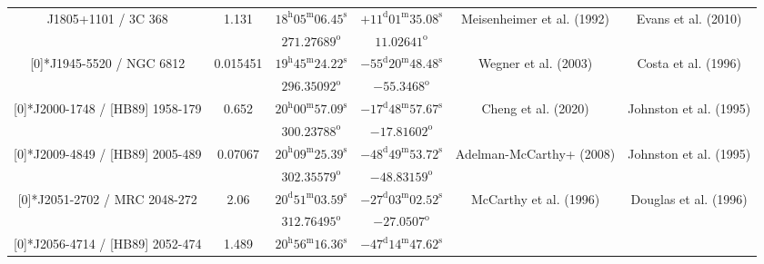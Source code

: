 \begin{landscape}
\begin{longtable}{cccccc}
  \multirow{2}[0]{*}{J1805+1101 / 3C 368} & \multirow{2}[0]{*}{1.131} &  
    $18^\text{h}05^\text{m}06.45^\text{s}$  & $+11^\text{d}01^\text{m}35.08^\text{s}$  & 
    \multirow{2}[0]{*}{Meisenheimer et al. (1992)\cite{RedRef71_1992}}& \multirow{2}[0]{*}{Evans et al. (2010)\cite{CoordRef1_2010}} \\*
    & & $271.27689^\text{o}$ & $11.02641^\text{o}$ & & \\ \addlinespace 
 \multirow{2}[0]{*}{J1945-5520 / NGC 6812} & \multirow{2}[0]{*}{0.015451} &  
    $19^\text{h}45^\text{m}24.22^\text{s}$  & $ -55^\text{d}20^\text{m}48.48^\text{s}$  & 
    \multirow{2}[0]{*}{Wegner et al. (2003)\cite{RedRef72_2003}}& \multirow{2}[0]{*}{Costa et al. (1996)\cite{CoordRef72_1996}} \\*
    & & $296.35092^\text{o}$ & $-55.3468^\text{o}$ & & \\ \addlinespace 
 \multirow{2}[0]{*}{J2000-1748 / [HB89] 1958-179} & \multirow{2}[0]{*}{0.652} &  
    $20^\text{h}00^\text{m}57.09^\text{s} $  & $-17^\text{d}48^\text{m}57.67^\text{s} $  & 
    \multirow{2}[0]{*}{Cheng et al. (2020) \cite{RedRef20_2020}}& \multirow{2}[0]{*}{Johnston et al. (1995)\cite{CoordRef0_1995}} \\*
    & & $300.23788^\text{o}$ & $-17.81602^\text{o}$ & & \\ \addlinespace 
 \multirow{2}[0]{*}{J2009-4849 / [HB89] 2005-489} & \multirow{2}[0]{*}{0.07067} &  
    $20^\text{h}09^\text{m}25.39^\text{s}$  & $-48^\text{d}49^\text{m}53.72^\text{s}$  & 
    \multirow{2}[0]{*}{Adelman-McCarthy+ (2008) \cite{CoordRef28_2008}}& \multirow{2}[0]{*}{Johnston et al. (1995)\cite{CoordRef0_1995}} \\*
    & & $302.35579^\text{o}$ & $-48.83159^\text{o}$ & & \\ \addlinespace
  \multirow{2}[0]{*}{J2051-2702 / MRC 2048-272} & \multirow{2}[0]{*}{2.06} &  
    $20^\text{d}51^\text{m}03.59^\text{s}$  & $-27^\text{d}03^\text{m}02.52^\text{s}$  & 
    \multirow{2}[0]{*}{McCarthy et al. (1996)\cite{RedRef38_1996}}& \multirow{2}[0]{*}{Douglas et al. (1996)\cite{CoordRef10_1996}} \\*
    & & $312.76495^\text{o}$ & $-27.0507^\text{o}$ & & \\ \addlinespace 
 \multirow{2}[0]{*}{J2056-4714 / [HB89] 2052-474} & \multirow{2}[0]{*}{1.489} &  
    $20^\text{h}56^\text{m}16.36^\text{s}$  & $-47^\text{d}14^\text{m}47.62^\text{s}$  & 

\end{longtable}
\end{landscape}
